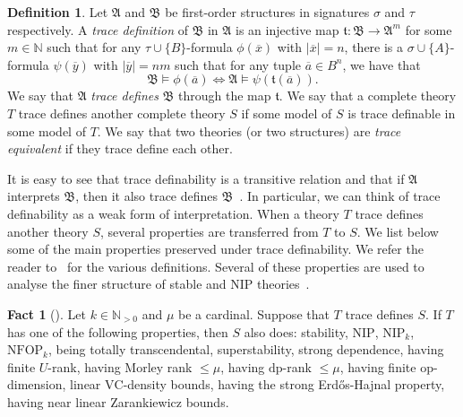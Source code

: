 \documentclass{amsart}
\theoremstyle{definition}
\newtheorem{definition}[theorem]{Definition}
\newtheorem{fact}[theorem]{Fact}
\theoremstyle{remark}
\numberwithin{equation}{section}
\newcommand{\fa}{\mathfrak{A}}
\newcommand{\fb}{\mathfrak{B}}
\begin{document}
\begin{definition} Let $\fa$ and $\fb$ be first-order structures in signatures $\sigma$ and $\tau$ respectively. A \emph{trace definition} of $\fb$ in $\fa$ is an injective map $\mathfrak{t}:\fb\to\fa^m$ for some $m\in\mathbb{N}$ such that for any $\tau\cup\{B\}$-formula $\phi(\overline{x})$ with $|\overline{x}|=n$, there is a $\sigma\cup\{A\}$-formula $\psi(\overline{y})$ with $|\overline{y}|=nm$ such that for any tuple $\overline{a}\in B^n$, we have that
\[\fb\vDash \phi(\overline{a})\Leftrightarrow \fa\vDash\psi(\mathfrak{t}(\overline{a})).\]
We say that $\fa$ \emph{trace defines} $\fb$ through the map $\mathfrak{t}$. We say that a complete theory $T$ trace defines another complete theory $S$ if some model of $S$ is trace definable in some model of $T$. We say that two theories (or two structures) are \emph{trace equivalent} if they trace define each other.
\end{definition}

It is easy to see that trace definability is a transitive relation and that if $\fa$ interprets $\fb$, then it also trace defines $\fb$~\cite{Walsbergshort}. In particular, we can think of trace definability as a weak 
form 
of interpretation. When a theory $T$ trace defines another theory $S$, several properties are 
transferred 
from $T$ to $S$. We list below some of the main properties preserved under trace definability. We refer the reader to~\cite{Walsbergshort} for the various definitions. Several of these properties are used to analyse the finer structure of stable and $\mathrm{NIP}$ theories~\cite{shelah2014strongly, SimonRankOne, aschenbrenner2016vapnik, basit2021zarankiewicz}.

\begin{fact}[{\cite{Walsbergshort, walsberg2026tracedefinabilityipreservation,walsberg2026tracedefinabilityiimodeltheoretic}}]\label{fact:tracedefpreserved} Let $k\in\mathbb{N}_{>0}$ and $\mu$ be a cardinal. Suppose that $T$ trace defines $S$. If $T$ has one of the following properties, then $S$ also does: stability, $\mathrm{NIP}$, $\mathrm{NIP}_k$, $\mathrm{NFOP}_k$, being totally transcendental, superstability, strong dependence, having finite $U$-rank, having Morley rank $\leq\mu$, having $\mathrm{dp}$-rank $\leq\mu$, having finite $\mathrm{op}$-dimension, linear $\mathrm{VC}$-density bounds, having the strong {Erd\H{o}s}-Hajnal 
property, having near linear Zarankiewicz bounds. 
\end{fact}
\end{document}
